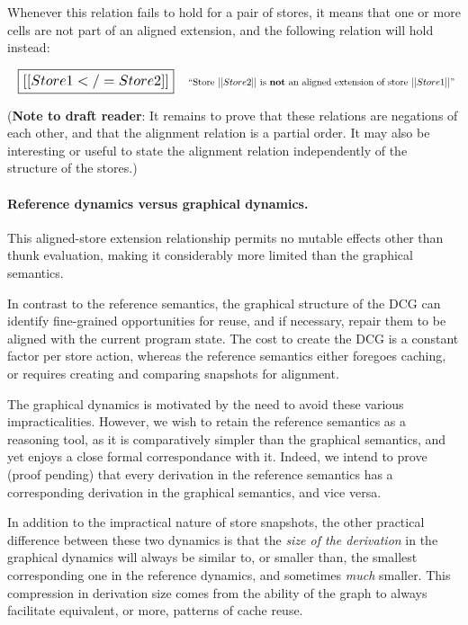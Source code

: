 \documentclass[11pt]{article}
\begin{document}
\noindent
Whenever this relation fails to hold for a pair of stores, it means
that one or more cells are not part of an aligned extension, and the
following relation will hold instead:

\[
\begin{array}{ll}
  \scalebox{1.5}{
\boxed{
  [[Store1 </= Store2]]}
}
&
\text{``Store $[[Store2]]$ is \textbf{not} an aligned extension of store~$[[Store1]]$''}
\end{array}
\]

\begin{mathpar}
\end{mathpar}

\noindent
(\textbf{Note to draft reader}:
It remains to prove that these relations are negations of each other,
and that the alignment relation is a partial order.
%
It may also be interesting or useful to state the alignment relation
independently of the structure of the stores.)

\paragraph{Reference dynamics versus graphical dynamics.}
%
This aligned-store extension relationship permits no
mutable effects other than thunk evaluation, making it considerably
more limited than the graphical semantics.

In contrast to the reference semantics, the graphical structure of the
DCG can identify fine-grained opportunities for reuse, and if
necessary, repair them to be aligned with the current program state.
%
The cost to create the DCG is a constant factor per store action,
whereas the reference semantics either foregoes caching, or requires
creating and comparing snapshots for alignment.

%
The graphical dynamics is motivated by the need to avoid these various
impracticalities.
%
However, we wish to retain the reference semantics as a reasoning tool,
as it is comparatively simpler than the graphical semantics,
and yet enjoys a close formal correspondance with it.
%
Indeed, we intend to prove (proof pending) that every derivation in
the reference semantics has a corresponding derivation in the
graphical semantics, and vice versa.

In addition to the impractical nature of store snapshots, the other practical
difference between these two dynamics is that the \emph{size of the
derivation} in the graphical dynamics will always be similar to, or
smaller than, the smallest corresponding one in the reference
dynamics, and sometimes \emph{much} smaller.
%
This compression in derivation size comes from the ability of the
graph to always facilitate equivalent, or more, patterns of cache reuse.
\end{document}
